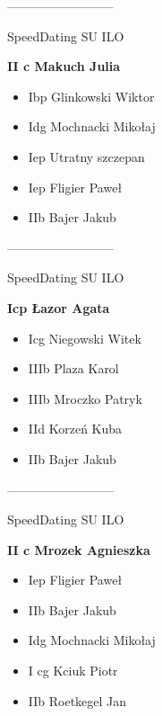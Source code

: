 \documentclass[a4paper,10pt]{article}
\begin{document}
\begin{multicols}{3}
\begin{minipage}[l]{\textwidth}
\begin{itemize}
    \end{itemize}



\end{minipage}



\begin{minipage}[l]{\textwidth}
--------------------------

  \footnotesize{SpeedDating SU ILO}

  \bfseries{II c Makuch Julia}

  \begin{itemize}
    \item Ibp Glinkowski Wiktor
    \item Idg Mochnacki Mikołaj
    \item Iep Utratny szczepan
    \item Iep Fligier Paweł
    \item IIb Bajer Jakub

    \end{itemize}



\end{minipage}



\begin{minipage}[l]{\textwidth}
--------------------------

  \footnotesize{SpeedDating SU ILO}

  \bfseries{Icp Łazor Agata}

  \begin{itemize}
    \item Icg Niegowski Witek
    \item IIIb Plaza Karol
    \item IIIb Mroczko Patryk
    \item IId Korzeń Kuba
    \item IIb Bajer Jakub

    \end{itemize}



\end{minipage}



\begin{minipage}[l]{\textwidth}
--------------------------

  \footnotesize{SpeedDating SU ILO}

  \bfseries{II c Mrozek Agnieszka}

  \begin{itemize}
    \item Iep Fligier Paweł
    \item IIb Bajer Jakub
    \item Idg Mochnacki Mikołaj
    \item I cg Kciuk Piotr
    \item IIb Roetkegel Jan


\end{itemize}
\end{minipage}
\end{multicols}
\end{document}
